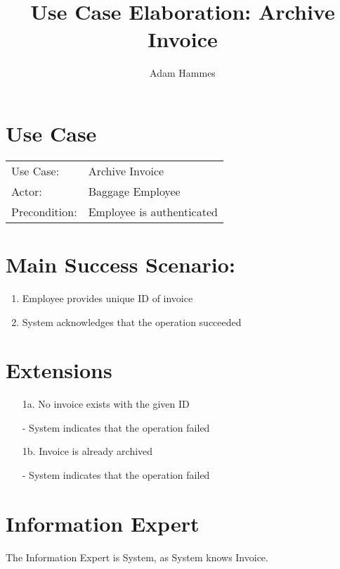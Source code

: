 \documentclass{article}
\title{Use Case Elaboration: Archive Invoice}
\author{ Adam Hammes }
\begin{document}
\maketitle


\section*{Use Case}
\begin{tabular}{l l}
Use Case:     & Archive Invoice\\
Actor:        & Baggage Employee\\
Precondition: & Employee is authenticated\\
\end{tabular}
 

\section*{Main Success Scenario:}

\begin{enumerate}
    \item Employee provides unique ID of invoice
    \item System acknowledges that the operation succeeded

\end{enumerate}

\section*{Extensions}

\begin{itemize}
    \item [1a.] No invoice exists with the given ID
    
    - System indicates that the operation failed
    
    \item [1b.] Invoice is already archived
    
    - System indicates that the operation failed
\end{itemize}

\section*{Information Expert}

The Information Expert is System, as System knows Invoice.
\end{document}
